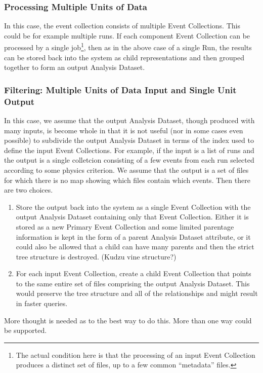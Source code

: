 \documentclass{cmspaper}
\begin{document}
\subsubsection{Processing Multiple Units of Data}

In this case, the event collection consists of multiple Event Collections. This 
could be for example multiple runs.  If each component Event Collection can be 
processed by a single job\footnote{The actual condition here is that the processing 
of an input Event Collection produces a distinct set of files, up to a few common ``metadata'' 
files.}, then as in the above case of a single Run, the results
can be stored back into the system as child representations and then grouped
together to form an output Analysis Dataset.  

\subsubsection{Filtering: Multiple Units of Data Input and Single Unit Output}

In this case, we assume that the output Analysis Dataset, though produced with
many inputs, is become whole in that it is not useful (nor in some cases 
even possible) to subdivide the output Analysis Dataset in terms of the 
index used to define the input Event Collections.  For example, if the input is 
a list of runs and the  output is a single colletcion consisting of a few 
events from each run selected according  to some physics criterion. We 
assume that the output is a set of files for which there is no map
showing which files contain which events.  Then there are two choices.
\begin{enumerate}
\item Store the output back into the system as a single Event Collection with 
the output Analysis Dataset containing only that Event Collection.  Either it 
is stored as a new Primary Event Collection and some limited parentage information 
is kept in the form of a parent Analysis Dataset attribute,  or it 
could also be allowed that a child can have many parents and then the strict 
tree structure is destroyed.  (Kudzu vine structure?) 
\item For each input Event Collection, create a child Event Collection that points 
to the same entire set of files comprising the output Analysis Dataset.  This
would preserve the tree structure and all of the relationships and might 
result in faster queries.  
\end{enumerate}
More thought is needed as to the best way to do this.  More than one way could be 
supported.  
\end{document}
